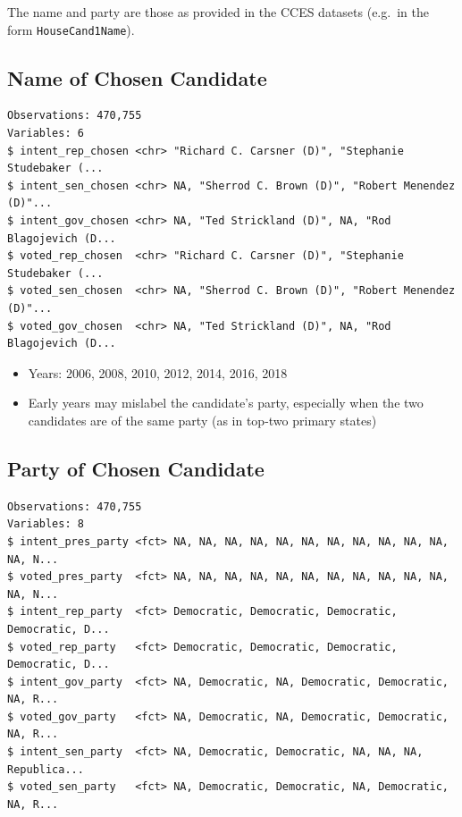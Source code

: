 \documentclass[10pt,article,oneside]{memoir}
\theoremstyle{definition}
\begin{document}
The name and party are those as provided in the CCES datasets (e.g.~in
the form \texttt{HouseCand1Name}).

\hypertarget{name-of-chosen-candidate}{%
\subsection{Name of Chosen Candidate}\label{name-of-chosen-candidate}}

\begin{verbatim}
Observations: 470,755
Variables: 6
$ intent_rep_chosen <chr> "Richard C. Carsner (D)", "Stephanie Studebaker (...
$ intent_sen_chosen <chr> NA, "Sherrod C. Brown (D)", "Robert Menendez (D)"...
$ intent_gov_chosen <chr> NA, "Ted Strickland (D)", NA, "Rod Blagojevich (D...
$ voted_rep_chosen  <chr> "Richard C. Carsner (D)", "Stephanie Studebaker (...
$ voted_sen_chosen  <chr> NA, "Sherrod C. Brown (D)", "Robert Menendez (D)"...
$ voted_gov_chosen  <chr> NA, "Ted Strickland (D)", NA, "Rod Blagojevich (D...
\end{verbatim}

\begin{itemize}
\tightlist
\item
  Years: 2006, 2008, 2010, 2012, 2014, 2016, 2018
\item
  Early years may mislabel the candidate's party, especially when the
  two candidates are of the same party (as in top-two primary states)
\end{itemize}

\hypertarget{party-of-chosen-candidate}{%
\subsection{Party of Chosen Candidate}\label{party-of-chosen-candidate}}

\begin{verbatim}
Observations: 470,755
Variables: 8
$ intent_pres_party <fct> NA, NA, NA, NA, NA, NA, NA, NA, NA, NA, NA, NA, N...
$ voted_pres_party  <fct> NA, NA, NA, NA, NA, NA, NA, NA, NA, NA, NA, NA, N...
$ intent_rep_party  <fct> Democratic, Democratic, Democratic, Democratic, D...
$ voted_rep_party   <fct> Democratic, Democratic, Democratic, Democratic, D...
$ intent_gov_party  <fct> NA, Democratic, NA, Democratic, Democratic, NA, R...
$ voted_gov_party   <fct> NA, Democratic, NA, Democratic, Democratic, NA, R...
$ intent_sen_party  <fct> NA, Democratic, Democratic, NA, NA, NA, Republica...
$ voted_sen_party   <fct> NA, Democratic, Democratic, NA, Democratic, NA, R...
\end{verbatim}
\end{document}
